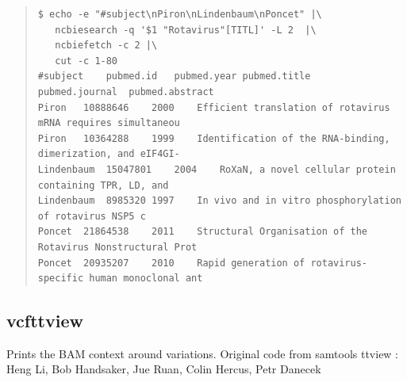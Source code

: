 \documentclass[12pt]{article}
\begin{document}
\begin{quote}
\begin{verbatim}
$ echo -e "#subject\nPiron\nLindenbaum\nPoncet" |\
   ncbiesearch -q '$1 "Rotavirus"[TITL]' -L 2  |\
   ncbiefetch -c 2 |\
   cut -c 1-80
#subject	pubmed.id	pubmed.year	pubmed.title	pubmed.journal	pubmed.abstract
Piron	10888646	2000	Efficient translation of rotavirus mRNA requires simultaneou
Piron	10364288	1999	Identification of the RNA-binding, dimerization, and eIF4GI-
Lindenbaum	15047801	2004	RoXaN, a novel cellular protein containing TPR, LD, and
Lindenbaum	8985320	1997	In vivo and in vitro phosphorylation of rotavirus NSP5 c
Poncet	21864538	2011	Structural Organisation of the Rotavirus Nonstructural Prot
Poncet	20935207	2010	Rapid generation of rotavirus-specific human monoclonal ant
\end{verbatim}
\end{quote}



\subsection{vcfttview}
Prints the BAM context around variations.
Original code from samtools ttview : Heng Li, Bob Handsaker, Jue Ruan, Colin Hercus, Petr Danecek
\end{document}

